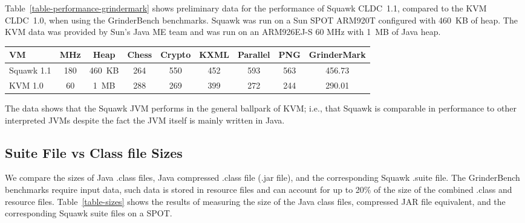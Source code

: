 \documentclass{sigplanconf}
\newcommand{\doublecentertablebegin}{\begin{table*}[htp] \begin{center}}
\newcommand{\doublecentertableend}[2]{{\bf \caption{\label{#1} {#2}}} \end{center} \end{table*} }
\begin{document}
Table~\ref{table-performance-grindermark} shows preliminary data for the 
performance of Squawk CLDC~1.1, compared to the KVM CLDC~1.0, 
when using the GrinderBench benchmarks.   
Squawk was run on a Sun SPOT ARM920T configured with 460~KB of heap.  
The KVM data was provided by Sun's Java ME team and was run on an 
ARM926EJ-S 60 MHz with 1~MB of Java heap.

\doublecentertablebegin
\begin{tabular}{|l|c|c|c|c|c|c|c|c|} \hline
VM & MHz & Heap & Chess & Crypto & KXML & Parallel & PNG & GrinderMark \\ \hline
Squawk 1.1 & 180 & 460~KB & 264 & 550 & 452 & 593 & 563 & 456.73 \\
KVM 1.0    &  60 &  1~MB  & 288 & 269 & 399 & 272 & 244 & 290.01 \\ \hline
\end{tabular}
\doublecentertableend{table-performance-grindermark}{GrinderBench Results} 

The data shows that the Squawk JVM performs in the general ballpark of KVM; i.e., 
that Squawk is comparable in performance to other interpreted JVMs despite the fact 
the JVM itself is mainly written in Java. 


\subsection{Suite File vs Class file Sizes}
\label{sec-results-filesizes}

We compare the sizes of Java .class files, Java compressed .class file (.jar
file), and the corresponding Squawk .suite file.  
The GrinderBench benchmarks require input data, such data is stored in 
resource files and can account for up to 20\% of the size of the combined 
.class and resource files.  
Table~\ref{table-sizes} shows the results of measuring the size of the
Java class files, compressed JAR file equivalent, and the corresponding Squawk 
suite files on a SPOT.
\end{document}
